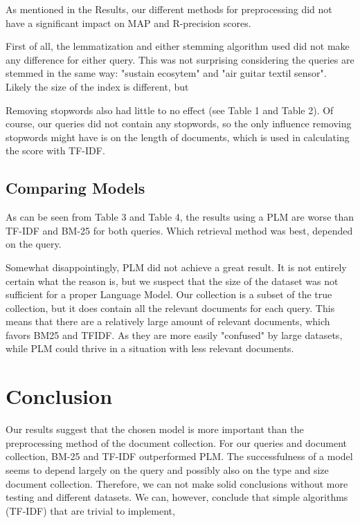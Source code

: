 \documentclass{article}
\begin{document}
As mentioned in the Results, our different methods for preprocessing did not have a significant impact on MAP and R-precision scores. 

First of all, the lemmatization and either stemming algorithm used did not make any difference for either query. This was not surprising considering the queries are stemmed in the same way: "sustain ecosytem" and "air guitar textil sensor". Likely the size of the index is different, but  

Removing stopwords also had little to no effect (see Table 1 and Table 2). Of course, our queries did not contain any stopwords, so the only influence removing stopwords might have is on the length of documents, which is used in calculating the score with TF-IDF. 

\subsection*{Comparing Models}

As can be seen from Table 3 and Table 4, the results using a PLM are worse than TF-IDF and BM-25 for both queries. Which retrieval method was best, depended on the query.

Somewhat disappointingly, PLM did not achieve a great result. It is not entirely certain what the reason is, but we suspect that the size of the dataset was not sufficient for a proper Language Model. Our collection is a subset of the true collection, but it does contain all the relevant documents for each query. This means that there are a relatively large amount of relevant documents, which favors BM25 and TFIDF. As they are more easily "confused" by large datasets, while PLM could thrive in a situation with less relevant documents.

\section*{Conclusion}

Our results suggest that the chosen model is more important than the preprocessing method of the document collection. For our queries and document collection, BM-25 and TF-IDF outperformed PLM. The successfulness of a model seems to depend largely on the query and possibly also on the type and size document collection. Therefore, we can not make solid conclusions without more testing and different datasets. We can, however, conclude that simple algorithms (TF-IDF) that are trivial to implement, 



\end{document}

